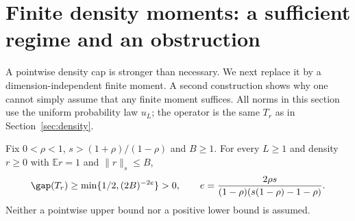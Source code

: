 \section{Finite density moments: a sufficient regime and an obstruction}
\label{sec:finite-moment}
A pointwise density cap is stronger than necessary. We next replace it
by a dimension-independent finite moment. A second construction shows why
one cannot simply assume that any finite moment suffices. All norms in
this section use the uniform probability law $u_L$; the operator is the
same $T_r$ as in Section~\ref{sec:density}.

\begin{theorem}\label{thm:moment}
Fix $0<\rho<1$, $s>(1+\rho)/(1-\rho)$ and $B\ge1$. For every $L\ge1$
and density $r\ge0$ with $\mathbb E r=1$ and $\|r\|_s\le B$,
\[
 \gap(T_r)\ge\min\{1/2,(2B)^{-2e}\}>0,
 \qquad e=\frac{2\rho s}{(1-\rho)(s(1-\rho)-1-\rho)}.
\]
Neither a pointwise upper bound nor a positive lower bound is assumed.
\end{theorem}
